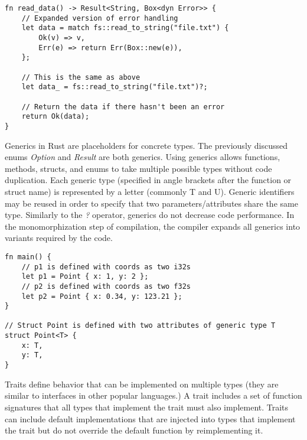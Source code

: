 \documentclass[12pt]{article}
\begin{document}
\singlespacing{}
\begin{verbatim}
fn read_data() -> Result<String, Box<dyn Error>> {
    // Expanded version of error handling
    let data = match fs::read_to_string("file.txt") {
        Ok(v) => v,
        Err(e) => return Err(Box::new(e)),
    };

    // This is the same as above
    let data_ = fs::read_to_string("file.txt")?;

    // Return the data if there hasn't been an error
    return Ok(data);
}
\end{verbatim}
\doublespacing{}

Generics in Rust are placeholders for concrete types. The previously discussed
enums \textit{Option} and \textit{Result} are both generics. Using generics
allows functions, methods, structs, and enums to take multiple possible types
without code duplication. Each generic type (specified in angle brackets after
the function or struct name) is represented by a letter (commonly T and U).
Generic identifiers may be reused in order to specify that two
parameters/attributes share the same type. Similarly to the \textit{?}
operator, generics do not decrease code performance. In the monomorphization
step of compilation, the compiler expands all generics into variants required
by the code.

\singlespacing{}
\begin{verbatim}
fn main() {
    // p1 is defined with coords as two i32s
    let p1 = Point { x: 1, y: 2 };
    // p2 is defined with coords as two f32s
    let p2 = Point { x: 0.34, y: 123.21 };
}

// Struct Point is defined with two attributes of generic type T
struct Point<T> {
    x: T,
    y: T,
}
\end{verbatim}
\doublespacing{}

Traits define behavior that can be implemented on multiple types (they are
similar to interfaces in other popular languages.) A trait includes a set of
function signatures that all types that implement the trait must also
implement. Traits can include default implementations that are injected into
types that implement the trait but do not override the default function by
reimplementing it.
\end{document}
